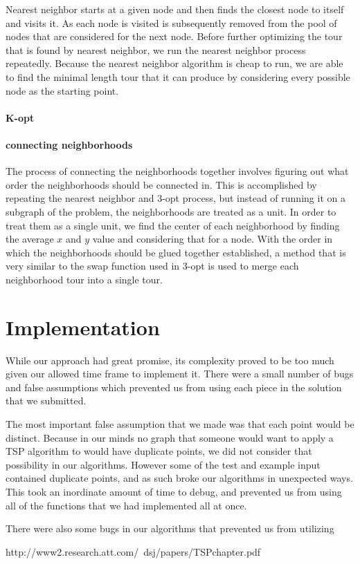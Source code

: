 \documentclass[12pt]{article}
\begin{document}
Nearest neighbor starts at a given node and then finds the closest node to
itself and visits it. As each node is visited is subsequently removed from the
pool of nodes that are considered for the next node. Before further optimizing
the tour that is found by nearest neighbor, we run the nearest neighbor process
repeatedly. Because the nearest neighbor algorithm is cheap to run, we are able
to find the minimal length tour that it can produce by considering every
possible node as the starting point. 

\paragraph{K-opt}

\paragraph{connecting neighborhoods}

The process of connecting the neighborhoods together involves figuring out what
order the neighborhoods should be connected in. This is accomplished by
repeating the nearest neighbor and 3-opt process, but instead of running it on
a subgraph of the problem, the neighborhoods are treated as a unit.  In order
to treat them as a single unit, we find the center of each neighborhood by
finding the average $x$ and $y$ value and considering that for a node.  With
the order in which the neighborhoods should be glued together established, a
method that is very similar to the swap function used in 3-opt is used to merge
each neighborhood tour into a single tour.


\section*{Implementation}

While our approach had great promise, its complexity proved to be too much
given our allowed time frame to implement it.  There were a small number of
bugs and false assumptions which prevented us from using each piece in the
solution that we submitted.

The most important false assumption that we made was that each point would be
distinct.  Because in our minds no graph that someone would want to apply a TSP
algorithm to would have duplicate points, we did not consider that possibility
in our algorithms.  However some of the test and example input contained
duplicate points, and as such broke our algorithms in unexpected ways.  This
took an inordinate amount of time to debug, and prevented us from using all of
the functions that we had implemented all at once.

There were also some bugs in our algorithms that prevented us from utilizing 


http://www2.research.att.com/~dsj/papers/TSPchapter.pdf
\end{document}
